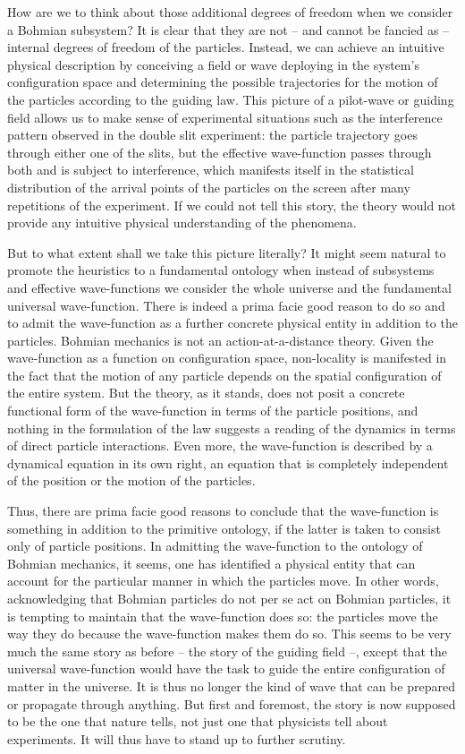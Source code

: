 \documentclass[12pt]{article}
\theoremstyle{definition}
\begin{document}
How are we to think about those additional degrees of freedom when we consider a Bohmian subsystem? It is clear that they are not -- and cannot be fancied as -- internal degrees of freedom of the particles. Instead, we can achieve an intuitive physical description by conceiving a field or wave deploying in the system's configuration space and determining the possible trajectories for the motion of the particles according to the guiding law. This picture of a pilot-wave or guiding field allows us to make sense of experimental situations such as the interference pattern observed in the double slit experiment: the particle trajectory goes through either one of the slits, but the effective wave-function passes through both and is subject to interference, which manifests itself in the statistical distribution of the arrival points of the particles on the screen after many repetitions of the experiment. If we could not tell this story, the theory would not provide any intuitive physical understanding of the phenomena.

But to what extent shall we take this picture literally? It might seem natural to promote the heuristics to a fundamental ontology when instead of subsystems and effective wave-functions we consider the whole universe and the fundamental universal wave-function. There is indeed a prima facie good reason to do so and to admit the wave-function as a further concrete physical entity in addition to the particles. Bohmian mechanics is not an action-at-a-distance theory. Given the wave-function as a function on configuration space, non-locality is manifested in the fact that the motion of any particle depends on the spatial configuration of the entire system. But the theory, as it stands, does not posit a concrete functional form of the wave-function in terms of the particle positions, and nothing in the formulation of the law suggests a reading of the dynamics in terms of direct particle interactions. Even more, the wave-function is described by a dynamical equation in its own right, an equation that is completely independent of the position or the motion of the particles.

Thus, there are prima facie good reasons to conclude that the wave-function is something in addition to the primitive ontology, if the latter is taken to consist only of particle positions. In admitting the wave-function to the ontology of Bohmian mechanics, it seems, one has identified a physical entity that can account for the particular manner in which the particles move. In other words, acknowledging that Bohmian particles do not per se act on Bohmian particles, it is tempting to maintain that the wave-function does so: the particles move the way they do because the wave-function makes them do so. This seems to be very much the same story as before -- the story of the guiding field --, except that the universal wave-function would have the task to guide the entire configuration of matter in the universe. It is thus no longer the kind of wave that can be prepared or propagate through anything. But first and foremost, the story is now supposed to be the one that nature tells, not just one that physicists tell about experiments. It will thus have to stand up to further scrutiny.
\end{document}
